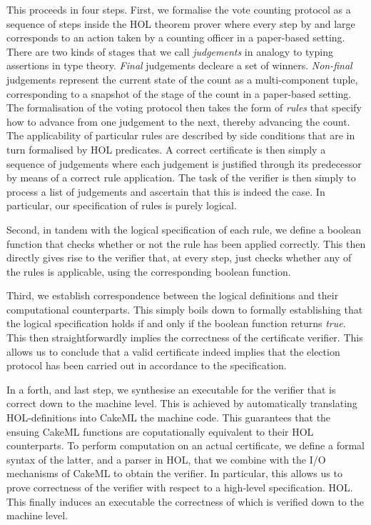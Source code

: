 \documentclass{llncs}
\begin{document}
This proceeds in four steps. 
First, we formalise  the vote counting protocol as a sequence of
steps inside the HOL theorem prover where every step by and large
corresponds to an action taken by a counting officer in a
paper-based setting.  There are two kinds of stages that we call
\emph{judgements} in analogy to typing assertions in type theory.
\emph{Final} judgements decleare a set of winners. 
\emph{Non-final} judgements represent the current state of the count
as a multi-component tuple, corresponding to a snapshot of the stage
of the count in a paper-based setting.  The formalisation of the
voting protocol then takes the form of \emph{rules} that specify how
to advance from one judgement to the next, thereby advancing the
count. The applicability of particular rules are described 
by side conditions that are in turn formalised by HOL predicates.  A
correct certificate is then simply a sequence of judgements where
each judgement is justified through its predecessor by means of a
correct rule application.  The task of the verifier is then simply
to process a list of judgements and ascertain that this is indeed
the case.  In particular, our specification of rules is purely
logical.


Second, in tandem with the logical specification of each rule, we
define a boolean function that checks whether or not the rule has
been applied correctly.  This then directly gives rise to the
verifier that, at every step, just checks whether any of the rules
is applicable, using the corresponding boolean function. 

Third, we establish correspondence between the logical
definitions and their computational counterparts. This simply boils
down to formally establishing that the logical specification holds
if and only if the boolean function returns \emph{true}. This then
straightforwardly implies the correctness of the certificate
verifier. This allows us to conclude that a valid certificate indeed
implies that the election protocol has been carried out in
accordance to the specification.


In a forth, and last step, we synthesise an executable for the
verifier that is correct down to the machine level.  This is
achieved by automatically translating HOL-definitions into CakeML
the machine code. This guarantees that the ensuing CakeML functions
are coputationally equivalent to their HOL counterparts. 
To perform computation on an actual certificate, we define a formal
syntax of the latter, and a parser in HOL, that we combine with the
I/O mechanisms of CakeML to obtain the verifier. 
In particular, this allows us to prove correctness of the verifier
with respect to a high-level specification. 
HOL. This finally induces an executable the correctness of which is
verified down to the machine level. 
\end{document}
